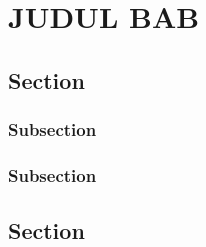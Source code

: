 \chapter{JUDUL BAB}
\section{Section}
\lipsum[1]
\subsection{Subsection}
\lipsum[1]
\subsection{Subsection}
\lipsum[1]
\section{Section}
\lipsum[2]
